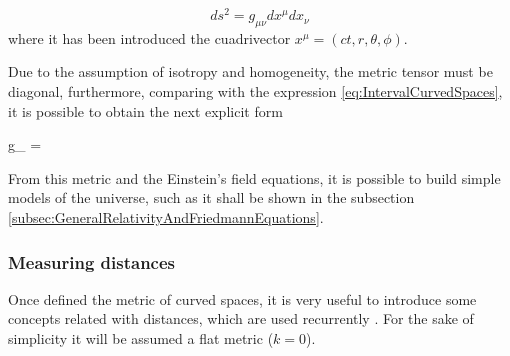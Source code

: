 \[ ds^2 = g_{\mu \nu}dx^\mu dx_\nu \]
where it has been introduced the cuadrivector $x^\mu = 
(ct, r, \theta, \phi)$.


Due to the assumption of isotropy and homogeneity, the metric tensor must
be diagonal, furthermore, comparing with the expression 
\ref{eq:IntervalCurvedSpaces}, it is possible to obtain the next explicit 
form



{g_{\mu \nu} = }


From this metric and the Einstein's field equations, it is possible to 
build simple models of the universe, such as it shall be shown in the 
subsection \ref{subsec:GeneralRelativityAndFriedmannEquations}.



			\subsubsection*{Measuring distances}


Once defined the metric of curved spaces, it is very useful to introduce
some concepts related with distances, which are used recurrently 
\cite{longair2008}. For the sake of simplicity it will be assumed a flat 
metric ($k = 0$).


